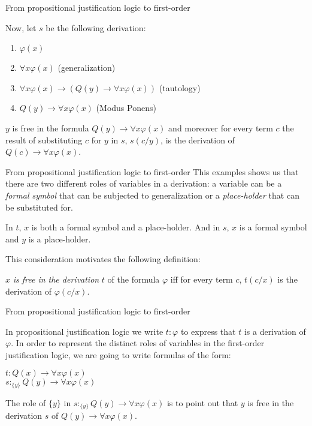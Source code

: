 \documentclass{beamer}
\theoremstyle{definition}
\newcommand{\impli}{\rightarrow}
\newcommand{\todo}{\forall}
\begin{document}
\begin{frame}{From propositional justification logic to first-order}
	
\qquad Now, let $s$ be the following derivation:

\begin{enumerate}[1.]
\item $\varphi(x)$ 
\item $\todo x \varphi(x)$                 (generalization)
\item $\todo x\varphi(x) \impli (Q(y) \impli \todo x\varphi(x))$ (tautology)
\item $Q(y) \impli \todo x\varphi(x)$ (Modus Ponens)
\end{enumerate}
	
\qquad $y$ is free in the formula $Q(y) \impli \todo x\varphi(x)$ and moreover for every term $c$ the result of substituting $c$ for $y$ in $s$, $s(c/y)$, is the  derivation of $Q(c) \impli \todo x\varphi(x)$.
\end{frame}




\begin{frame}{From propositional justification logic to first-order}
\qquad This examples shows us that there are two different roles of variables in a derivation: a variable can be a \textit{formal symbol} that can be subjected to generalization or a \textit{place-holder} that can be substituted for.

\qquad In $t$, $x$ is both a formal symbol and a place-holder. And in $s$, $x$ is a formal symbol and $y$ is a place-holder.

\qquad This consideration motivates the following definition:

\begin{center}
$x$ \textit{is free in the derivation} $t$ of the formula $\varphi$ iff for every term $c$, $t(c/x)$ is the derivation of $\varphi(c/x)$.
\end{center}

\end{frame}

\begin{frame}{From propositional justification logic to first-order}

\qquad In propositional justification logic we write $t$$: $$\varphi$ to express that $t$ is a derivation of $\varphi$. In order to represent the distinct roles of variables in the first-order justification logic, we are going to write formulas of the form:
\begin{center}
\vspace{5 mm}
$t$$:$$Q(x) \impli \todo x\varphi(x)$\\
\vspace{5 mm}
$s$$:_{\{y\}}$$Q(y) \impli \todo x\varphi(x)$
\end{center}


\qquad The role of $\{y\}$ in $s$$:_{\{y\}}$$Q(y) \impli \todo x\varphi(x)$ is to point out that $y$ is free in the derivation $s$ of $Q(y) \impli \todo x\varphi(x)$. 
\end{frame}
\end{document}
